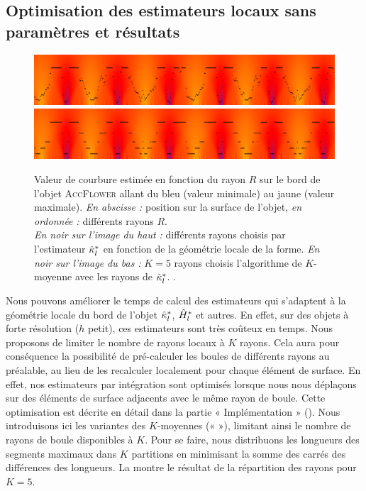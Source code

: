 \subsection{Optimisation des estimateurs locaux sans paramètres et résultats}
\label{sec:curvature:parameter-free:k-means}

\begin{figure}[ht]{
  \begin{center}
    \includegraphics[width=.95\linewidth]{images/Curvature/ScaleSpace_Flower_Local}
    \includegraphics[width=.95\linewidth]{images/Curvature/ScaleSpace_Flower_Local_5}
  \end{center}}
  \caption[Rayons choisis par  $\CurvHSL$ et répartitions en 5 partitions.]{Valeur de courbure estimée en fonction du rayon $R$ sur le bord de
  l'objet \textsc{AccFlower} allant du bleu (valeur minimale) au jaune (valeur
  maximale). \emph{En abscisse :} position sur la surface de l'objet, \emph{en
  ordonnée :} différents rayons $R$.
  \\
  \emph{En noir sur l'image du haut :} différents rayons choisis par
  l'estimateur $\CurvHSL$ en fonction de la géométrie locale de la forme.
  \emph{En noir sur l'image du bas :} $K = 5$ rayons choisis l'algorithme de
  $K$-moyenne avec les rayons de $\CurvHSL$.
  \label{fig:curvature-pfl-radii}.}
\end{figure}

Nous pouvons améliorer le temps de calcul des estimateurs qui s'adaptent à la
géométrie locale du bord de l'objet $\CurvHSL$, $\hat{H}^{*}_{l}$ et autres. En
effet, sur des objets à forte résolution (\cad $h$ petit), ces estimateurs sont
très coûteux en temps. Nous proposons de limiter le nombre de rayons locaux à
$K$ rayons. Cela aura pour conséquence la possibilité de pré-calculer les boules
de différents rayons au préalable, au lieu de les recalculer localement pour
chaque élément de surface. En effet, nos estimateurs par intégration sont
optimisés lorsque nous nous déplaçons sur des éléments de surface adjacents avec
le même rayon de boule. Cette optimisation est décrite en détail dans la partie «
Implémentation » (). Nous introduisons ici
les variantes des $K$-moyennes («  »), limitant ainsi le
nombre de rayons de boule disponibles à $K$. Pour se faire, nous distribuons les
longueurs des segments maximaux dans $K$ partitions en minimisant la somme des
carrés des différences des longueurs. La 
montre le résultat de la répartition des rayons pour $K=5$.

